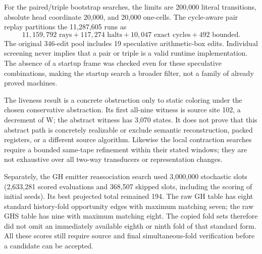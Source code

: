For the paired/triple bootstrap searches, the limits are 200,000 literal
transitions, absolute head coordinate 20,000, and 20,000 one-cells. The
cycle-aware pair replay partitions the 11,287,605 runs as
\[
11,159,792\text{ rays}+117,274\text{ halts}
 +10,047\text{ exact cycles}+492\text{ bounded}.
\]
The original 346-edit pool includes 19 speculative arithmetic-box edits.
Individual screening never implies that a pair or triple is a valid
runtime implementation. The absence of a startup frame was checked even
for these speculative combinations, making the startup search a broader
filter, not a family of already proved machines.

The liveness result is a concrete obstruction only to static coloring
under the chosen conservative abstraction. Its first all-nine witness is
source site 102, a decrement of W; the abstract witness has 3,070 states.
It does not prove that this abstract path is concretely realizable or
exclude semantic reconstruction, packed registers, or a different source
algorithm. Likewise the local contraction searches require a bounded
same-tape refinement within their stated windows; they are not exhaustive
over all two-way transducers or representation changes.

Separately, the GH emitter reassociation search used 3,000,000 stochastic
slots (2,633,281 scored evaluations and 368,507 skipped slots, including
the scoring of initial seeds). Its best projected total remained 194.
The raw GH table has eight standard history-fold opportunity edges with
maximum matching seven; the raw GHS table has nine with maximum matching
eight. The copied fold sets therefore did not omit an immediately
available eighth or ninth fold of that standard form. All these scores
still require source and final simultaneous-fold verification before a
candidate can be accepted.
